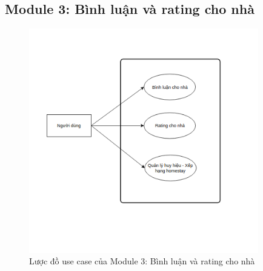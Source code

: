 \subsection{Module 3: Bình luận và rating cho nhà}
\begin{figure}[!h]
	\centering
	\includegraphics[width=10cm]{Image/tin-usecase.png}
	\caption{Lược đồ use case của Module 3: Bình luận và rating cho nhà}
\end{figure}

